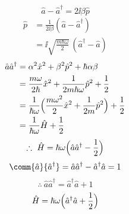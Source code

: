 \[ \hat{a}-\hat{a}^{\dagger}=2\ii\beta\hat{p} \]
\begin{align*}
\hat{p}&=\frac{1}{2\ii\beta}(\hat{a}-\hat{a}^{\dagger})\\
&=\ii\sqrt{\frac{m\hbar\omega}{2}}\,(\hat{a}^{\dagger}-\hat{a})
\end{align*}
\begin{align*}
\hat{a}\hat{a}^{\dagger}&=\alpha^{2}\hat{x}^{2}+\beta^{2}\hat{p}^{2}+\hbar\alpha\beta\\
&=\frac{m\omega}{2\hbar}\hat{x}^{2}+\frac{1}{2m\hbar\omega}\hat{p}^{2}+\frac{1}{2}\\
&=\frac{1}{\hbar\omega}\Bigl(\frac{m\omega^{2}}{2}\hat{x}^{2}+\frac{1}{2m}\hat{p}^{2}\Bigr)+\frac{1}{2}\\
&=\frac{1}{\hbar\omega}\hat{H}+\frac{1}{2}
\end{align*}
\[ \therefore\ \hat{H}=\hbar\omega\Bigl(\hat{a}\hat{a}^{\dagger}-\frac{1}{2}\Bigr) \]
\[ \comm{\hat{a}}{\hat{a}^{\dagger}}=\hat{a}\hat{a}^{\dagger}-\hat{a}^{\dagger}\hat{a}=1 \]
\[ \therefore\ \hat{a}\hat{a}^{\dagger}=\hat{a}^{\dagger}\hat{a}+1 \]
\[ \hat{H}=\hbar\omega\Bigl(\hat{a}^{\dagger}\hat{a}+\frac{1}{2}\Bigr) \]
